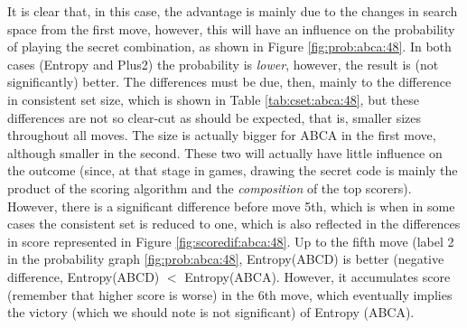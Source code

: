\documentclass[preprint,12pt]{elsarticle}
\begin{document}
It is clear that, in this case, the advantage is mainly due to the
changes in search space from the first move, however, this will have
an influence on the probability of playing the secret combination, as
shown in Figure \ref{fig:prob:abca:48}. In both cases (Entropy and
Plus2) the probability is {\em lower}, however, the result is (not
significantly) better. The differences must be due, then, mainly to
the difference in consistent set size, which is shown in Table
\ref{tab:cset:abca:48}, but these differences are not so clear-cut as
should be expected, that is, smaller sizes throughout all moves. The
size is actually bigger for ABCA in the first move, although smaller
in the second. These two will actually have little influence on the
outcome (since, at that stage in games, drawing the secret code is
mainly the product of the scoring algorithm and the {\em composition}
of the top scorers). However, there is a significant difference before
move 5th, which is when in some cases the consistent set is reduced to
one, which is also reflected in the differences in score represented
in Figure \ref{fig:scoredif:abca:48}. Up to the fifth move (label 2 in
the probability graph \ref{fig:prob:abca:48}, Entropy(ABCD) is better
(negative difference, Entropy(ABCD) $<$ Entropy(ABCA). However, it
accumulates score (remember that higher score is worse) in the 6th
move, which eventually implies the victory (which we should note is
not significant) of Entropy (ABCA). 
\end{document}
